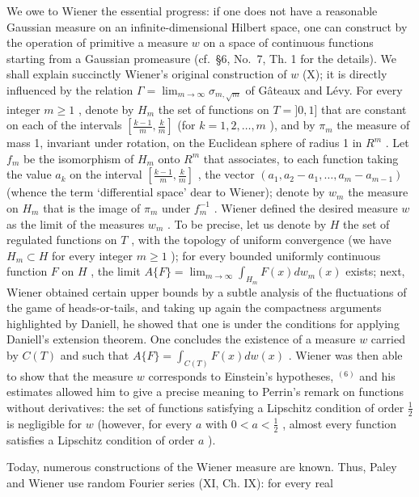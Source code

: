 We owe to Wiener the essential progress: if one does not have a reasonable Gaussian measure on an infinite-dimensional Hilbert space, one can construct by the operation of primitive a measure \(w\) on a space of continuous functions starting from a Gaussian promeasure (cf.~§6, No.~7, Th. 1 for the details). We shall explain succinctly Wiener's original construction of \(w\) (X); it is directly influenced by the relation \(\Gamma = \lim_{m \to \infty} \sigma_{m,\sqrt{m}}\) of Gâteaux and Lévy. For every integer \(m \geqslant 1\) , denote by \(H_m\) the set of functions on \(T = ]0,1]\) that are constant on each of the intervals \(\left[ \frac{k-1}{m}, \frac{k}{m} \right]\) (for \(k = 1,2,\ldots,m\) ), and by \(\pi_m\) the measure of mass 1, invariant under rotation, on the Euclidean sphere of radius 1 in \(R^m\) . Let \(f_m\) be the isomorphism of \(H_m\) onto \(R^m\) that associates, to each function taking the value \(a_k\) on the interval \(\left[ \frac{k-1}{m}, \frac{k}{m} \right]\) , the vector \((a_1, a_2 - a_1, \ldots, a_m - a_{m-1})\) (whence the term `differential space' dear to Wiener); denote by \(w_m\) the measure on \(H_m\) that is the image of \(\pi_m\) under \(f_m^{-1}\) . Wiener defined the desired measure \(w\) as the limit of the measures \(w_m\) . To be precise, let us denote by \(H\) the set of regulated functions on \(T\) , with the topology of uniform convergence (we have \(H_m \subset H\) for every integer \(m \geqslant 1\) ); for every bounded uniformly continuous function \(F\) on \(H\) , the limit \(A\{F\} = \lim_{m \to \infty} \int_{H_m} F(x) dw_m(x)\) exists; next, Wiener obtained certain upper bounds by a subtle analysis of the fluctuations of the game of heads-or-tails, and taking up again the compactness arguments highlighted by Daniell, he showed that one is under the conditions for applying Daniell's extension theorem. One concludes the existence of a measure \(w\) carried by \(C(T)\) and such that \(A\{F\} = \int_{C(T)} F(x) dw(x)\) . Wiener was then able to show that the measure \(w\) corresponds to Einstein's hypotheses, \(^{(6)}\) and his estimates allowed him to give a precise meaning to Perrin's remark on functions without derivatives: the set of functions satisfying a Lipschitz condition of order \(\frac{1}{2}\) is negligible for \(w\) (however, for every \(a\) with \(0 < a < \frac{1}{2}\) , almost every function satisfies a Lipschitz condition of order \(a\) ).

Today, numerous constructions of the Wiener measure are known. Thus, Paley and Wiener use random Fourier series (XI, Ch. IX): for every real

